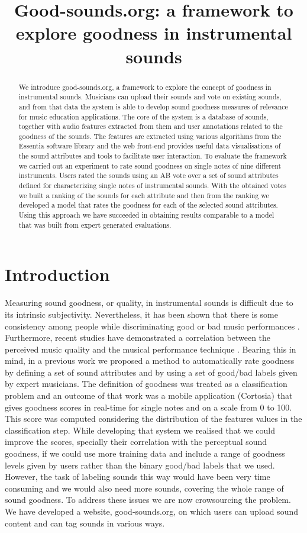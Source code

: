 \documentclass{article}
\title{Good-sounds.org: a framework to explore goodness in instrumental sounds}
\begin{document}
%
\maketitle
%
\begin{abstract}
We introduce good-sounds.org, a framework to explore the concept of goodness in instrumental sounds. Musicians can upload their sounds and vote on existing sounds, and from that data the system is able to develop sound goodness measures of relevance for music education applications. The core of the system is a database of sounds, together with audio features extracted from them and user annotations related to the goodness of the sounds. The features are extracted using various algorithms from the Essentia software library and the web front-end provides useful data visualisations of the sound attributes and tools to facilitate user interaction. To evaluate the framework we carried out an experiment to rate sound goodness on single notes of nine different instruments. Users rated the sounds using an AB vote over a set of sound attributes defined for characterizing single notes of instrumental sounds. With the obtained votes we built a ranking of the sounds for each attribute and then from the ranking we developed a model that rates the goodness for each of the selected sound attributes. Using this approach we have succeeded in obtaining results comparable to a model that was built from expert generated evaluations.
\end{abstract}
%
\section{Introduction}\label{sec:introduction}

Measuring sound goodness, or quality, in instrumental sounds is difficult due to its intrinsic subjectivity. Nevertheless, it has been shown that there is some consistency among people while discriminating good or bad music performances \cite{1}. Furthermore, recent studies have demonstrated a correlation between the perceived music quality and the musical performance technique \cite{2}. Bearing this in mind, in a previous work \cite{01} we proposed a method to automatically rate goodness by defining a set of sound attributes and by using a set of good/bad labels given by  expert musicians. The definition of goodness was treated as a classification problem and an outcome of that work was a mobile application (Cortosia) that gives goodness scores in real-time for single notes and on a scale from 0 to 100. This score was computed considering the distribution of the features values in the classification step. While developing that system we realised that we could improve the scores, specially their correlation with the perceptual sound goodness, if we could use more training data and include a range of goodness levels given by users rather than the binary good/bad labels that we used. However, the task of labeling sounds this way would have been very time consuming and we would  also need more sounds, covering the whole range of sound goodness. To address these issues we are now crowsourcing the problem. We have developed a website, good-sounds.org, on which users can upload sound content and can tag sounds in various ways.      
%
\end{document}
